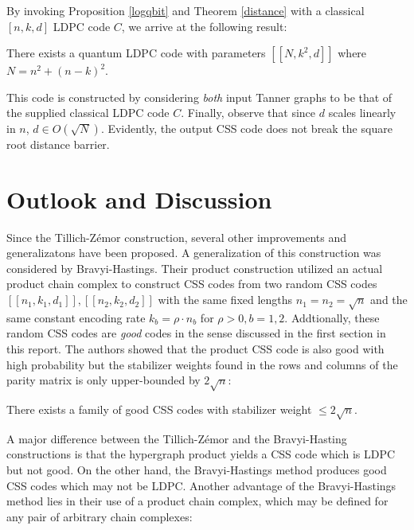 \documentclass[12pt]{article}%
\theoremstyle{definition}
\begin{document}
\noindent By invoking Proposition \ref{logqbit} and Theorem \ref{distance} with a classical $[n,k,d]$ 
LDPC code $C$, we arrive at the following result:

\vspace{7pt}
\begin{theorem} \cite{tillich2013quantum} 
  There exists a quantum LDPC code with parameters $[[N, k^2, d]]$ where $N = n^2 + (n-k)^2$.
\end{theorem}
\vspace{5pt}

\noindent This code is constructed by considering \emph{both} input Tanner graphs to be that of the supplied classical LDPC code $C$. Finally, observe that since $d$ scales linearly in $n$, $d \in O(\sqrt{N})$. Evidently, the output CSS code does not break the square root distance barrier.


\section{Outlook and Discussion}

Since the Tillich-Z\'emor construction, several other improvements and generalizatons have been proposed. A generalization of this construction was considered by Bravyi-Hastings. Their product construction utilized an actual product chain complex to construct CSS codes from two random CSS codes $[[n_1,k_1,d_1]], [[n_2,k_2,d_2]]$ with the same fixed lengths $n_1 = n_2 = \sqrt{n}$ and the same constant encoding rate $k_b = \rho\cdot n_b$ for $\rho > 0, b=1,2$. Addtionally, these random CSS codes are \emph{good} codes in the sense discussed in the first section in this report. The authors showed that the product CSS code is also good with high probability but the stabilizer weights found in the rows and columns of the parity matrix is only upper-bounded by $2\sqrt{n}$:

\vspace{7pt}
\begin{theorem} \cite{bravyi2014homological}
  There exists a family of good CSS codes with stabilizer weight $\leq 2\sqrt{n}$.
\end{theorem} 
\vspace{5pt}

\noindent A major difference between the Tillich-Z\'emor and the Bravyi-Hasting constructions is that the hypergraph product yields a CSS code which is LDPC but not good. On the other hand, the Bravyi-Hastings method produces good CSS codes which may not be LDPC. Another advantage of the Bravyi-Hastings method lies in their use of a product chain complex, which may be defined for any pair of arbitrary chain complexes:
\end{document}
